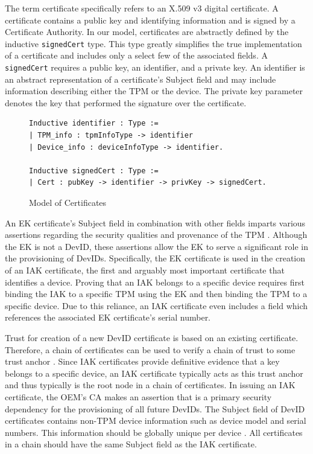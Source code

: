 \documentclass[runningheads]{llncs}
\begin{document}
The term certificate specifically refers to an X.509 v3 digital certificate. 
A certificate contains a public key and identifying information and is
signed by a Certificate Authority. In our model, certificates are abstractly defined by the inductive \verb|signedCert| type. This type greatly simplifies the true implementation of a certificate and includes only a select few of the associated fields. A \verb|signedCert| requires a public key, an identifier, and a private key. An identifier is an abstract representation of a certificate's Subject field and may include information describing either the TPM or the device. The private key parameter denotes the key that performed the signature over the certificate.
\begin{figure}[h]
\begin{lstlisting}[language=Coq]
Inductive identifier : Type :=
| TPM_info : tpmInfoType -> identifier
| Device_info : deviceInfoType -> identifier.

Inductive signedCert : Type :=
| Cert : pubKey -> identifier -> privKey -> signedCert.
\end{lstlisting}
\caption{Model of Certificates}
\end{figure}

An EK certificate's Subject field in combination with other fields imparts various assertions regarding the security qualities and provenance of the TPM \citep{EKSpec}. 
Although the EK is not a DevID, these assertions allow the EK to serve a significant role in the provisioning of DevIDs.
Specifically, the EK certificate is used in the creation of an IAK certificate, the first and arguably most important certificate that identifies a device.
Proving that an IAK belongs to a specific device requires first binding the IAK to a specific TPM using the EK and then binding the TPM to a specific device. Due to this reliance, an IAK certificate even includes a field which references the associated EK certificate's serial number.

Trust for creation of a new DevID certificate is based on an existing certificate. Therefore, a chain of certificates can be used to verify a chain of trust to some trust anchor \citep{DevIDSpec-TCG}. Since IAK certificates provide definitive evidence that a key belongs to a specific device, an IAK certificate typically acts as this trust anchor and thus typically is the root node in a chain of certificates. In issuing an IAK certificate, the OEM's CA makes an assertion that is a primary security dependency for the provisioning of all future DevIDs. 
The Subject field of DevID certificates contains non-TPM device information such as device model and serial numbers. This information should be globally unique per device \citep{DevIDSpec-IEEE}. All certificates in a chain should have the same Subject field as the IAK certificate.
\end{document}
